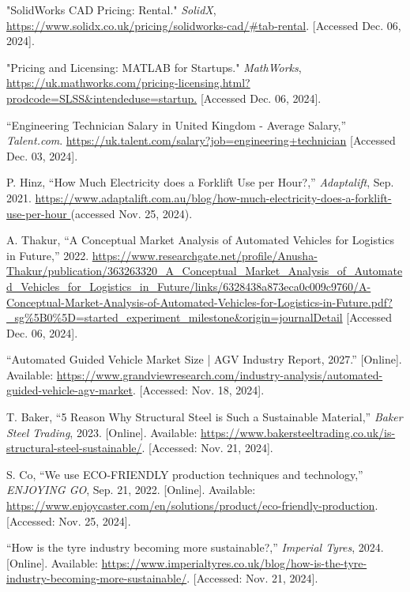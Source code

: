 \documentclass[12pt,titlepage]{article}
\begin{document}
\begin{thebibliography}{99}
 "SolidWorks CAD Pricing: Rental." \textit{SolidX}, \url{https://www.solidx.co.uk/pricing/solidworks-cad/#tab-rental}. [Accessed Dec. 06, 2024].

 "Pricing and Licensing: MATLAB for Startups." \textit{MathWorks}, \url{https://uk.mathworks.com/pricing-licensing.html?prodcode=SLSS&intendeduse=startup.} [Accessed Dec. 06, 2024].

 “Engineering Technician Salary in United Kingdom - Average Salary,” \textit{Talent.com}. \url{https://uk.talent.com/salary?job=engineering+technician} [Accessed Dec. 03, 2024].

P. Hinz, “How Much Electricity does a Forklift Use per Hour?,” \textit{Adaptalift}, Sep. 2021. \url{https://www.adaptalift.com.au/blog/how-much-electricity-does-a-forklift-use-per-hour }(accessed Nov. 25, 2024).

 A. Thakur, “A Conceptual Market Analysis of Automated Vehicles for Logistics in Future,” 2022. \url{https://www.researchgate.net/profile/Anusha-Thakur/publication/363263320_A_Conceptual_Market_Analysis_of_Automated_Vehicles_for_Logistics_in_Future/links/6328438a873eca0c009c9760/A-Conceptual-Market-Analysis-of-Automated-Vehicles-for-Logistics-in-Future.pdf?_sg%5B0%5D=started_experiment_milestone&origin=journalDetail} [Accessed Dec. 06, 2024].

 “Automated Guided Vehicle Market Size | AGV Industry Report, 2027.” [Online]. Available: \url{https://www.grandviewresearch.com/industry-analysis/automated-guided-vehicle-agv-market}. [Accessed: Nov. 18, 2024].

 T. Baker, ``5 Reason Why Structural Steel is Such a Sustainable Material,'' \textit{Baker Steel Trading}, 2023. [Online]. Available: \url{https://www.bakersteeltrading.co.uk/is-structural-steel-sustainable/}. [Accessed: Nov. 21, 2024].

 S. Co, ``We use ECO-FRIENDLY production techniques and technology,'' \textit{ENJOYING GO}, Sep. 21, 2022. [Online]. Available: \url{https://www.enjoycaster.com/en/solutions/product/eco-friendly-production}. [Accessed: Nov. 25, 2024].

``How is the tyre industry becoming more sustainable?,'' \textit{Imperial Tyres}, 2024. [Online]. Available: \url{https://www.imperialtyres.co.uk/blog/how-is-the-tyre-industry-becoming-more-sustainable/}. [Accessed: Nov. 21, 2024].


\end{thebibliography}
\end{document}
